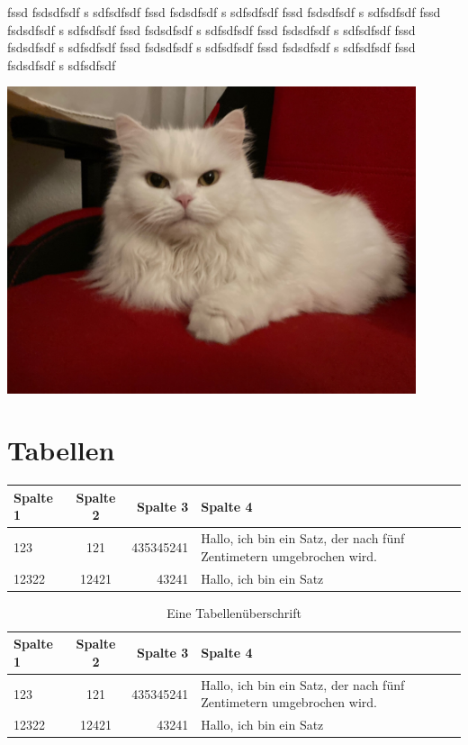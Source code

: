 \documentclass[12pt,ngerman,parskip=half]{scrreprt}
\begin{document}
\blindtext[2] fssd fsdsdfsdf s sdfsdfsdf fssd fsdsdfsdf s sdfsdfsdf fssd fsdsdfsdf s sdfsdfsdf fssd fsdsdfsdf s sdfsdfsdf fssd fsdsdfsdf s sdfsdfsdf fssd fsdsdfsdf s sdfsdfsdf fssd fsdsdfsdf s sdfsdfsdf fssd fsdsdfsdf s sdfsdfsdf fssd fsdsdfsdf s sdfsdfsdf fssd fsdsdfsdf s sdfsdfsdf 


\begin{minipage}{\textwidth}
\begin{center}
\includegraphics[width=0.9\textwidth]{./Bilder/Katze.jpg} %
\label{fig:katze2}
\end{center}
\end{minipage}


\chapter{Tabellen}\label{ch:tabelle}

\begin{tabular}{|l|c|r|p{5cm}|} \hline
\textbf{Spalte 1} & \textbf{Spalte 2} & \textbf{Spalte 3} & \textbf{Spalte 4} \\ \hline
123 & 121 & 435345241 & Hallo, ich bin ein Satz, der nach fünf Zentimetern umgebrochen wird. \\ \hline
12322 & 12421 & 43241 & Hallo, ich bin ein Satz \\ \hline
\end{tabular}


\begin{table}[h]
\begin{center}
\caption{Eine Tabellenüberschrift}
\begin{tabular}{lcrp{5cm}} \toprule
\textbf{Spalte 1} & \textbf{Spalte 2} & \textbf{Spalte 3} & \textbf{Spalte 4} \\ \midrule
123 & 121 & 435345241 & Hallo, ich bin ein Satz, der nach fünf Zentimetern umgebrochen wird. \\ 
12322 & 12421 & 43241 & Hallo, ich bin ein Satz \\ \bottomrule
\end{tabular}
\end{center}
\end{table}
\end{document}
